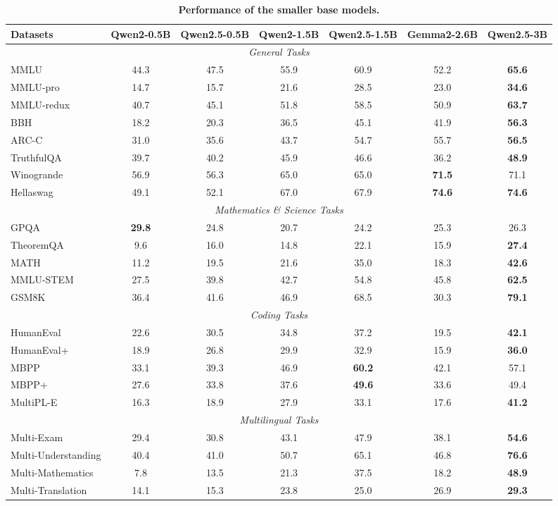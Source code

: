 \begin{table}[t]
\centering
\caption{\textbf{Performance of the smaller base models.}}
\label{tab:base-small}
\small %
\setlength{\tabcolsep}{3pt} %
\renewcommand{\arraystretch}{0.9} %
\begin{tabular}{@{}lcccccc@{}}
\toprule
\textbf{Datasets} & \textbf{Qwen2-0.5B} & \textbf{Qwen2.5-0.5B} & \textbf{Qwen2-1.5B} & \textbf{Qwen2.5-1.5B} & \textbf{Gemma2-2.6B} & \textbf{Qwen2.5-3B} \\
\midrule
\multicolumn{7}{c}{\textit{General Tasks}} \\
\midrule
MMLU & 44.3 & 47.5 & 55.9 & 60.9 & 52.2 & \textbf{65.6} \\
MMLU-pro & 14.7 & 15.7 & 21.6 & 28.5 & 23.0 & \textbf{34.6} \\
MMLU-redux & 40.7 & 45.1 & 51.8 & 58.5 & 50.9 & \textbf{63.7} \\
BBH & 18.2 & 20.3 & 36.5 & 45.1 & 41.9 & \textbf{56.3} \\
ARC-C & 31.0 & 35.6 & 43.7 & 54.7 & 55.7 & \textbf{56.5} \\
TruthfulQA & 39.7 & 40.2 & 45.9 & 46.6 & 36.2 & \textbf{48.9} \\
Winogrande & 56.9 & 56.3 & 65.0 & 65.0 & \textbf{71.5} & 71.1 \\
Hellaswag & 49.1 & 52.1 & 67.0 & 67.9 & \textbf{74.6} & \textbf{74.6} \\
\midrule
\multicolumn{7}{c}{\textit{Mathematics \& Science Tasks}} \\
\midrule
GPQA & \textbf{29.8} & 24.8 & 20.7 & 24.2 & 25.3 & 26.3 \\
TheoremQA & 9.6 & 16.0 & 14.8 & 22.1 & 15.9 & \textbf{27.4} \\
MATH & 11.2 & 19.5 & 21.6 & 35.0 & 18.3 & \textbf{42.6} \\
MMLU-STEM & 27.5 & 39.8 & 42.7 & 54.8 & 45.8 & \textbf{62.5} \\
GSM8K & 36.4 & 41.6 & 46.9 & 68.5 & 30.3 & \textbf{79.1} \\
\midrule
\multicolumn{7}{c}{\textit{Coding Tasks}} \\
\midrule
HumanEval & 22.6 & 30.5 & 34.8 & 37.2 & 19.5 & \textbf{42.1} \\
HumanEval+ & 18.9 & 26.8 & 29.9 & 32.9 & 15.9 & \textbf{36.0} \\
MBPP & 33.1 & 39.3 & 46.9 & \textbf{60.2} & 42.1 & 57.1 \\
MBPP+ & 27.6 & 33.8 & 37.6 & \textbf{49.6} & 33.6 & 49.4 \\
MultiPL-E & 16.3 & 18.9 & 27.9 & 33.1 & 17.6 & \textbf{41.2} \\
\midrule
\multicolumn{7}{c}{\textit{Multilingual Tasks}} \\
\midrule
Multi-Exam & 29.4 & 30.8 & 43.1 & 47.9 & 38.1 & \textbf{54.6} \\
Multi-Understanding & 40.4 & 41.0 & 50.7 & 65.1 & 46.8 & \textbf{76.6} \\
Multi-Mathematics & 7.8 & 13.5 & 21.3 & 37.5 & 18.2 & \textbf{48.9} \\
Multi-Translation & 14.1 & 15.3 & 23.8 & 25.0 & 26.9 & \textbf{29.3} \\
\bottomrule
\end{tabular}
\end{table}


